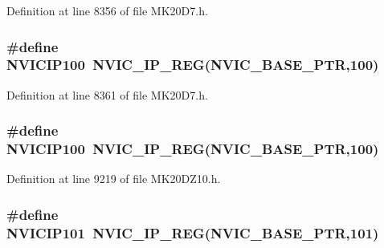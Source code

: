 Definition at line 8356 of file M\+K20\+D7.\+h.

\subsubsection[{\texorpdfstring{N\+V\+I\+C\+I\+P100}{NVICIP100}}]{\setlength{\rightskip}{0pt plus 5cm}\#define N\+V\+I\+C\+I\+P100~{\bf N\+V\+I\+C\+\_\+\+I\+P\+\_\+\+R\+EG}({\bf N\+V\+I\+C\+\_\+\+B\+A\+S\+E\+\_\+\+P\+TR},100)}\hypertarget{group___n_v_i_c___register___accessor___macros_gad74aee497d522e92fceb276aae606cc5}{}\label{group___n_v_i_c___register___accessor___macros_gad74aee497d522e92fceb276aae606cc5}


Definition at line 8361 of file M\+K20\+D7.\+h.

\subsubsection[{\texorpdfstring{N\+V\+I\+C\+I\+P100}{NVICIP100}}]{\setlength{\rightskip}{0pt plus 5cm}\#define N\+V\+I\+C\+I\+P100~{\bf N\+V\+I\+C\+\_\+\+I\+P\+\_\+\+R\+EG}({\bf N\+V\+I\+C\+\_\+\+B\+A\+S\+E\+\_\+\+P\+TR},100)}\hypertarget{group___n_v_i_c___register___accessor___macros_gad74aee497d522e92fceb276aae606cc5}{}\label{group___n_v_i_c___register___accessor___macros_gad74aee497d522e92fceb276aae606cc5}


Definition at line 9219 of file M\+K20\+D\+Z10.\+h.

\subsubsection[{\texorpdfstring{N\+V\+I\+C\+I\+P101}{NVICIP101}}]{\setlength{\rightskip}{0pt plus 5cm}\#define N\+V\+I\+C\+I\+P101~{\bf N\+V\+I\+C\+\_\+\+I\+P\+\_\+\+R\+EG}({\bf N\+V\+I\+C\+\_\+\+B\+A\+S\+E\+\_\+\+P\+TR},101)}\hypertarget{group___n_v_i_c___register___accessor___macros_ga3abc64f611789aa81aad805a9670dcc4}{}\label{group___n_v_i_c___register___accessor___macros_ga3abc64f611789aa81aad805a9670dcc4}


